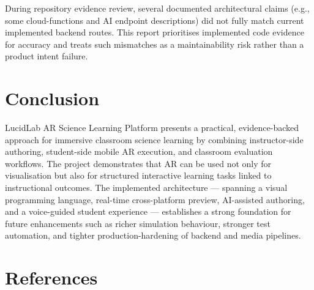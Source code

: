\documentclass[12pt,a4paper]{article}
\begin{document}
During repository evidence review, several documented architectural claims (e.g., some
cloud-functions and AI endpoint descriptions) did not fully match current implemented
backend routes. This report prioritises implemented code evidence for accuracy and treats
such mismatches as a maintainability risk rather than a product intent failure.

\section{Conclusion}

LucidLab AR Science Learning Platform presents a practical, evidence-backed approach for
immersive classroom science learning by combining instructor-side authoring, student-side
mobile AR execution, and classroom evaluation workflows. The project demonstrates that AR
can be used not only for visualisation but also for structured interactive learning tasks
linked to instructional outcomes. The implemented architecture --- spanning a visual
programming language, real-time cross-platform preview, AI-assisted authoring, and a
voice-guided student experience --- establishes a strong foundation for future
enhancements such as richer simulation behaviour, stronger test automation, and tighter
production-hardening of backend and media pipelines.

\section{References}
\end{document}
